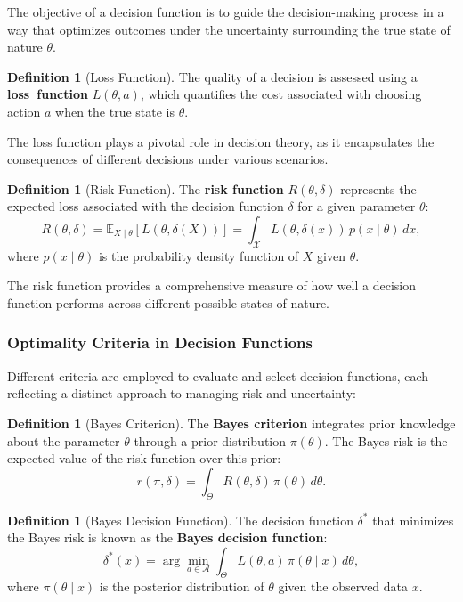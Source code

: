 \documentclass[magisterska, english]{pwr_wmat_praca_dyplomowa}
\theoremstyle{plain}
\numberwithin{theorem}{chapter}
\theoremstyle{definition}
\numberwithin{theorem}{chapter}
\newtheorem{definition}[theorem]{Definition}
\begin{document}
The objective of a decision function is to guide the decision-making process in a way that optimizes outcomes under the uncertainty surrounding the true state of nature \( \theta \).

\begin{definition}[Loss Function]
	The quality of a decision is assessed using a \textbf{loss~function} \( L(\theta, a) \), which quantifies the cost associated with choosing action \( a \) when the true state is \( \theta \).
\end{definition}

The loss function plays a pivotal role in decision theory, as it encapsulates the consequences of different decisions under various scenarios.

\begin{definition}[Risk Function]
	The \textbf{risk function} \( R(\theta, \delta) \) represents the expected loss associated with the decision function \( \delta \) for a given parameter \( \theta \):
	\[
	R(\theta, \delta) = \mathbb{E}_{X \mid \theta}[L(\theta, \delta(X))] = \int_{\mathcal{X}} L(\theta, \delta(x)) \, p(x \mid \theta) \, dx,
	\]
	where \( p(x \mid \theta) \) is the probability density function of \( X \) given \( \theta \).
\end{definition}

The risk function provides a comprehensive measure of how well a decision function performs across different possible states of nature.

\subsubsection{Optimality Criteria in Decision Functions}

Different criteria are employed to evaluate and select decision functions, each reflecting a distinct approach to managing risk and uncertainty:

\begin{definition}[Bayes Criterion]
	The \textbf{Bayes criterion} integrates prior knowledge about the parameter \( \theta \) through a prior distribution \( \pi(\theta) \). The Bayes risk is the expected value of the risk function over this prior:
	\[
	r(\pi, \delta) = \int_{\Theta} R(\theta, \delta) \, \pi(\theta) \, d\theta.
	\]
\end{definition}

\begin{definition}[Bayes Decision Function]
	The decision function \( \delta^* \) that minimizes the Bayes risk is known as the \textbf{Bayes decision function}:
	\[
	\delta^*(x) = \arg \min_{a \in \mathcal{A}} \int_{\Theta} L(\theta, a) \, \pi(\theta \mid x) \, d\theta,
	\]
	where \( \pi(\theta \mid x) \) is the posterior distribution of \( \theta \) given the observed data \( x \).
\end{definition}
\end{document}
